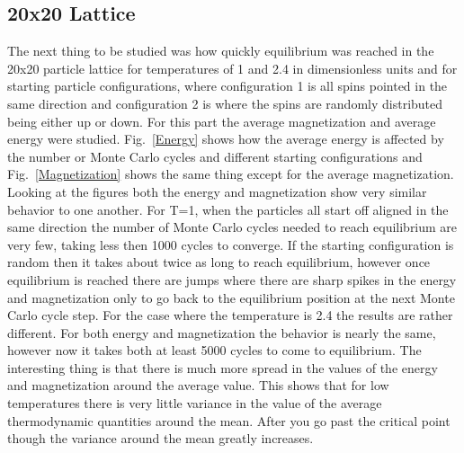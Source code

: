 \documentclass[12pt,righttag]{article}
\begin{document}
	\subsection{20x20 Lattice}
	The next thing to be studied was how quickly equilibrium was reached in the 20x20 particle lattice for temperatures of 1 and 2.4 in dimensionless units and for starting particle configurations, where configuration 1 is all spins pointed in the same direction and configuration 2 is where the spins are randomly distributed being either up or down. For this part the average magnetization and average energy were studied. Fig.~\ref{Energy} shows how the average energy is affected by the number or Monte Carlo cycles and different starting configurations and Fig.~\ref{Magnetization} shows the same thing except for the average magnetization. Looking at the figures both the energy and magnetization show very similar behavior to one another. For T=1, when the particles all start off aligned in the same direction the number of Monte Carlo cycles needed to reach equilibrium are very few, taking less then 1000 cycles to converge. If the starting configuration is random then it takes about twice as long to reach equilibrium, however once equilibrium is reached there are jumps where there are sharp spikes in the energy and magnetization only to go back to the equilibrium position at the next Monte Carlo cycle step. For the case where the temperature is 2.4 the results are rather different. For both energy and magnetization the behavior is nearly the same, however now it takes both at least 5000 cycles to come to equilibrium. The interesting thing is that there is much more spread in the values of the energy and magnetization around the average value. This shows that for low temperatures there is very little variance in the value of the average thermodynamic quantities around the mean. After you go past the critical point though the variance around the mean greatly increases.
	
\end{document}
